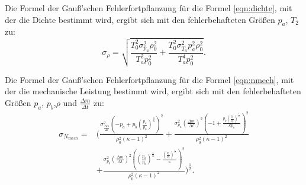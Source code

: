 \noindent Die Formel der Gauß'schen Fehlerfortpflanzung für die Formel \ref{eqn:dichte}, mit der die Dichte bestimmt wird, ergibt sich mit den fehlerbehafteten Größen 
$p_a$, $T_2$ zu:
\begin{equation}
 \sigma_{\rho} =\sqrt{\frac{T_{0}^{2} \sigma_{p_{a}}^{2} \rho_{0}^{2}}{T_{a}^{2} p_{0}^{2}} + \frac{T_{0}^{2} \sigma_{T_{a}}^{2} p_{a}^{2} \rho_{0}^{2}}{T_{a}^{4} p_{0}^{2}}}.
    \label{eq:dichteFehler}
\end{equation}

\noindent Die Formel der Gauß'schen Fehlerfortpflanzung für die Formel \ref{eqn:nmech}, mit der die mechanische Leistung bestimmt wird, ergibt sich mit den fehlerbehafteten Größen 
$p_a$, $p_b$,$\rho$ und $\frac{\Delta m}{\Delta t}$ zu:
\begin{equation}
    \begin{split}
        \sigma_{N_{mech}}= {} & \Biggl(\frac{\sigma_{\frac{\Delta m}{\Delta t}}^{2} \left(- p_{a} + p_{b} \left(\frac{p_{a}}{p_{b}}\right)^{\frac{1}{\kappa}}\right)^{2}}{\rho_{0}^{2} \left(\kappa - 1\right)^{2}} 
            + \frac{\sigma_{p_{a}}^{2} \left(\frac{\Delta m}{\Delta t}\right)^{2} \left(-1 + \frac{p_{b} \left(\frac{p_{a}}{p_{b}}\right)^{\frac{1}{\kappa}}}{\kappa p_{a}}\right)^{2}}{\rho_{0}^{2} \left(\kappa - 1\right)^{2}} \\ 
                       & + \frac{\sigma_{p_{b}}^{2} \left(\frac{\Delta m}{\Delta t}\right)^{2} \left(\left(\frac{p_{a}}{p_{b}}\right)^{\frac{1}{\kappa}} - \frac{\left(\frac{p_{a}}{p_{b}}\right)^{\frac{1}{\kappa}}}{\kappa}\right)^{2}}{\rho_{0}^{2} \left(\kappa - 1\right)^{2}} \Biggr)^{\frac{1}{2}}.
    \end{split}
    \label{eq:nmechFehler}
\end{equation}
